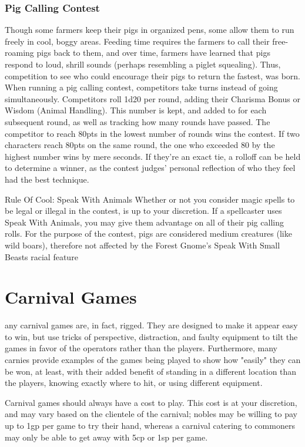 \documentclass[10pt,a4paper,twoside,bg=print,twocolumn,openany,nodeprecatedcode]{dndbook}
\begin{document}
\subsection{Pig Calling Contest}
Though some farmers keep their pigs in organized pens, some allow them to run freely in cool, boggy areas. Feeding time requires the farmers to call their free-roaming pigs back to them, and over time, farmers have learned that pigs respond to loud, shrill sounds (perhaps resembling a piglet squealing). Thus, competition to see who could encourage their pigs to return the fastest, was born.
When running a pig calling contest, competitors take turns instead of going simultaneously. Competitors roll 1d20 per round, adding their Charisma Bonus or Wisdom (Animal Handling). This number is kept, and added to for each subsequent round, as well as tracking how many rounds have passed. The competitor to reach 80pts in the lowest number of rounds wins the contest. If two characters reach 80pts on the same round, the one who exceeded 80 by the highest number wins by mere seconds. If they're an exact tie, a rolloff can be held to determine a winner, as the contest judges' personal reflection of who they feel had the best technique.
\begin{DndSidebar}[float=!b]{Rule Of Cool: Speak With Animals}
Whether or not you consider magic spells to be legal or illegal in the contest, is up to your discretion. If a spellcaster uses Speak With Animals, you may give them advantage on all of their pig calling rolls. For the purpose of the contest, pigs are considered medium creatures (like wild boars), therefore not affected by the Forest Gnome's Speak With Small Beasts racial feature


\end{DndSidebar}

\chapter{Carnival Games}
any carnival games are, in fact, rigged. They are designed to make it appear easy to win, but use tricks of perspective, distraction, and faulty equipment to tilt the games in favor of the operators rather than the players. Furthermore, many carnies provide examples of the games being played to show how "easily" they can be won, at least, with their added benefit of standing in a different location than the players, knowing exactly where to hit, or using different equipment.

Carnival games should always have a cost to play. This cost is at your discretion, and may vary based on the clientele of the carnival; nobles may be willing to pay up to 1gp per game to try their hand, whereas a carnival catering to commoners may only be able to get away with 5cp or 1sp per game.
\end{document}
